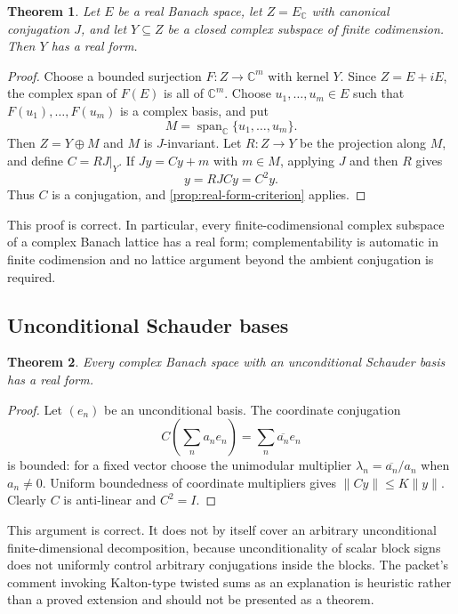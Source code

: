 \documentclass[11pt]{article}
\newtheorem{theorem}{Theorem}[section]
\theoremstyle{definition}
\theoremstyle{remark}
\newcommand{\C}{\mathbb C}
\begin{document}
\begin{theorem}\label{thm:finite-codim}
Let $E$ be a real Banach space, let $Z=E_{\C}$ with canonical conjugation $J$, and let $Y\subseteq Z$ be a closed complex subspace of finite codimension. Then $Y$ has a real form.
\end{theorem}

\begin{proof}
Choose a bounded surjection $F:Z\to\C^m$ with kernel $Y$. Since $Z=E+iE$, the complex span of $F(E)$ is all of $\C^m$. Choose $u_1,\dots,u_m\in E$ such that $F(u_1),\dots,F(u_m)$ is a complex basis, and put
\[
 M=\operatorname{span}_{\C}\{u_1,\dots,u_m\}.
\]
Then $Z=Y\oplus M$ and $M$ is $J$-invariant. Let $R:Z\to Y$ be the projection along $M$, and define $C=RJ|_Y$. If $Jy=Cy+m$ with $m\in M$, applying $J$ and then $R$ gives
\[
 y=RJC y=C^2y.
\]
Thus $C$ is a conjugation, and \cref{prop:real-form-criterion} applies.
\end{proof}

This proof is correct. In particular, every finite-codimensional complex subspace of a complex Banach lattice has a real form; complementability is automatic in finite codimension and no lattice argument beyond the ambient conjugation is required.

\subsection{Unconditional Schauder bases}

\begin{theorem}\label{thm:unconditional}
Every complex Banach space with an unconditional Schauder basis has a real form.
\end{theorem}

\begin{proof}
Let $(e_n)$ be an unconditional basis. The coordinate conjugation
\[
 C\left(\sum_n a_ne_n\right)=\sum_n\overline{a_n}e_n
\]
is bounded: for a fixed vector choose the unimodular multiplier $\lambda_n=\overline{a_n}/a_n$ when $a_n\ne0$. Uniform boundedness of coordinate multipliers gives $\|Cy\|\leq K\|y\|$. Clearly $C$ is anti-linear and $C^2=I$.
\end{proof}

This argument is correct. It does not by itself cover an arbitrary unconditional finite-dimensional decomposition, because unconditionality of scalar block signs does not uniformly control arbitrary conjugations inside the blocks. The packet's comment invoking Kalton-type twisted sums as an explanation is heuristic rather than a proved extension and should not be presented as a theorem.
\end{document}
